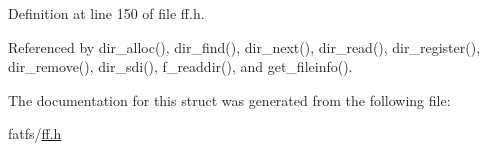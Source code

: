 Definition at line 150 of file ff.\-h.



Referenced by dir\-\_\-alloc(), dir\-\_\-find(), dir\-\_\-next(), dir\-\_\-read(), dir\-\_\-register(), dir\-\_\-remove(), dir\-\_\-sdi(), f\-\_\-readdir(), and get\-\_\-fileinfo().



The documentation for this struct was generated from the following file\-:\begin{DoxyCompactItemize}
\item 
fatfs/\hyperlink{ff_8h}{ff.\-h}\end{DoxyCompactItemize}

